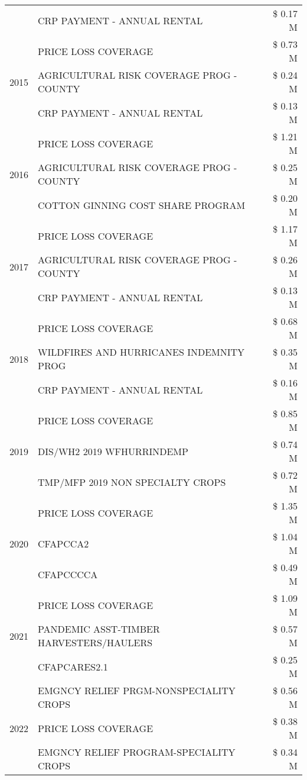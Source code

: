 \begin{tabular}{llr}
 & CRP PAYMENT - ANNUAL RENTAL & \$ 0.17 M \\
\cline{1-3}
\multirow[t]{3}{*}{2015} & PRICE LOSS COVERAGE & \$ 0.73 M \\
 & AGRICULTURAL RISK COVERAGE PROG - COUNTY & \$ 0.24 M \\
 & CRP PAYMENT - ANNUAL RENTAL & \$ 0.13 M \\
\cline{1-3}
\multirow[t]{3}{*}{2016} & PRICE LOSS COVERAGE & \$ 1.21 M \\
 & AGRICULTURAL RISK COVERAGE PROG - COUNTY & \$ 0.25 M \\
 & COTTON GINNING COST SHARE PROGRAM & \$ 0.20 M \\
\cline{1-3}
\multirow[t]{3}{*}{2017} & PRICE LOSS COVERAGE & \$ 1.17 M \\
 & AGRICULTURAL RISK COVERAGE PROG - COUNTY & \$ 0.26 M \\
 & CRP PAYMENT - ANNUAL RENTAL & \$ 0.13 M \\
\cline{1-3}
\multirow[t]{3}{*}{2018} & PRICE LOSS COVERAGE & \$ 0.68 M \\
 & WILDFIRES AND HURRICANES INDEMNITY PROG & \$ 0.35 M \\
 & CRP PAYMENT - ANNUAL RENTAL & \$ 0.16 M \\
\cline{1-3}
\multirow[t]{3}{*}{2019} & PRICE LOSS COVERAGE & \$ 0.85 M \\
 & DIS/WH2 2019 WFHURRINDEMP & \$ 0.74 M \\
 & TMP/MFP 2019 NON SPECIALTY CROPS & \$ 0.72 M \\
\cline{1-3}
\multirow[t]{3}{*}{2020} & PRICE LOSS COVERAGE & \$ 1.35 M \\
 & CFAPCCA2 & \$ 1.04 M \\
 & CFAPCCCCA & \$ 0.49 M \\
\cline{1-3}
\multirow[t]{3}{*}{2021} & PRICE LOSS COVERAGE & \$ 1.09 M \\
 & PANDEMIC ASST-TIMBER HARVESTERS/HAULERS & \$ 0.57 M \\
 & CFAPCARES2.1 & \$ 0.25 M \\
\cline{1-3}
\multirow[t]{3}{*}{2022} & EMGNCY RELIEF PRGM-NONSPECIALITY CROPS & \$ 0.56 M \\
 & PRICE LOSS COVERAGE & \$ 0.38 M \\
 & EMGNCY RELIEF PROGRAM-SPECIALITY CROPS & \$ 0.34 M \\
\cline{1-3}
\bottomrule
\end{tabular}
